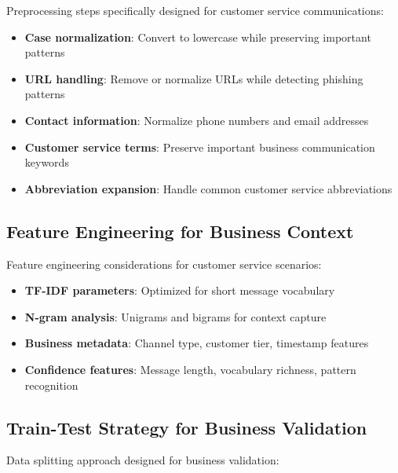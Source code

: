 \documentclass[12pt,a4paper]{article}
\begin{document}
Preprocessing steps specifically designed for customer service communications:

\begin{itemize}
    \item \textbf{Case normalization}: Convert to lowercase while preserving important patterns
    \item \textbf{URL handling}: Remove or normalize URLs while detecting phishing patterns
    \item \textbf{Contact information}: Normalize phone numbers and email addresses
    \item \textbf{Customer service terms}: Preserve important business communication keywords
    \item \textbf{Abbreviation expansion}: Handle common customer service abbreviations
\end{itemize}

\subsection{Feature Engineering for Business Context}

Feature engineering considerations for customer service scenarios:

\begin{itemize}
    \item \textbf{TF-IDF parameters}: Optimized for short message vocabulary
    \item \textbf{N-gram analysis}: Unigrams and bigrams for context capture
    \item \textbf{Business metadata}: Channel type, customer tier, timestamp features
    \item \textbf{Confidence features}: Message length, vocabulary richness, pattern recognition
\end{itemize}

\subsection{Train-Test Strategy for Business Validation}

Data splitting approach designed for business validation:
\end{document}
